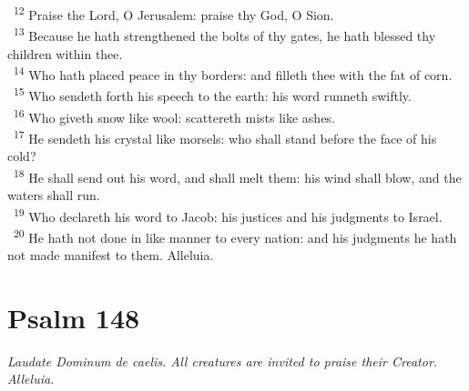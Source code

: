\documentclass[a5paper,12pt]{article}
\begin{document}
\begin{multicols*}{2}
~\textsuperscript{12} Praise the Lord, O Jerusalem: praise thy God, O Sion.\\
~\textsuperscript{13} Because he hath strengthened the bolts of thy gates, he hath blessed thy children within thee.\\
~\textsuperscript{14} Who hath placed peace in thy borders: and filleth thee with the fat of corn.\\
~\textsuperscript{15} Who sendeth forth his speech to the earth: his word runneth swiftly.\\
~\textsuperscript{16} Who giveth snow like wool: scattereth mists like ashes.\\
~\textsuperscript{17} He sendeth his crystal like morsels: who shall stand before the face of his cold?\\
~\textsuperscript{18} He shall send out his word, and shall melt them: his wind shall blow, and the waters shall run.\\
~\textsuperscript{19} Who declareth his word to Jacob: his justices and his judgments to Israel.\\
~\textsuperscript{20} He hath not done in like manner to every nation: and his judgments he hath not made manifest to them. Alleluia.\\

\section{Psalm 148}
\label{sec:org74ebe3a}
\emph{Laudate Dominum de caelis. All creatures are invited to praise their Creator. Alleluia.}\\


\end{multicols*}
\end{document}
